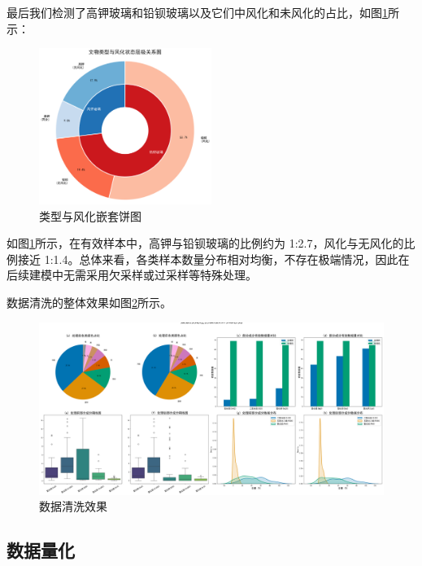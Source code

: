 最后我们检测了高钾玻璃和铅钡玻璃以及它们中风化和未风化的占比，如图\ref{fig:玻璃类型分布}所示：
\begin{figure}[htbp]
	\centering
	\includegraphics[width=0.5\textwidth]{figs/2模型准备/类型与风化嵌套饼图.png}
	\caption{类型与风化嵌套饼图}
	\label{fig:玻璃类型分布}
\end{figure}
如图\ref{fig:玻璃类型分布}所示，在有效样本中，高钾与铅钡玻璃的比例约为 1:2.7，风化与无风化的比例接近 1:1.4。总体来看，各类样本数量分布相对均衡，不存在极端情况，因此在后续建模中无需采用欠采样或过采样等特殊处理。

数据清洗的整体效果如图\ref{fig:数据清洗效果}所示。
\begin{figure}[htbp]
	\centering
	\includegraphics[width=\textwidth]{figs/2模型准备/预处理效果.png}
	\caption{数据清洗效果}
	\label{fig:数据清洗效果}
\end{figure}


\subsection{数据量化}

